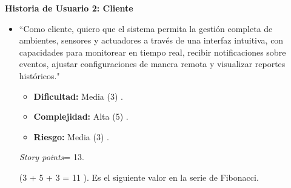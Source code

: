 \documentclass[
11pt, %
codirector, %
]{charter}
\begin{document}
\textbf{Historia de Usuario 2: Cliente}
\begin{itemize}
	\item ``Como cliente, quiero que el sistema permita la gestión completa de ambientes, sensores y actuadores a través de una interfaz intuitiva,
	      con capacidades para monitorear en tiempo real, recibir notificaciones sobre eventos, ajustar configuraciones de manera remota y visualizar
	      reportes históricos."

	      \begin{itemize}
		      \item \textbf{Dificultad:} Media (3) .
		      \item \textbf{Complejidad:} Alta (5) .
		      \item \textbf{Riesgo:} Media (3) .
	      \end{itemize}

	      \textit{Story points}= 13.

	      (3 + 5 + 3 = 11 ). Es el siguiente valor en la serie de Fibonacci.

\end{itemize}
\end{document}
